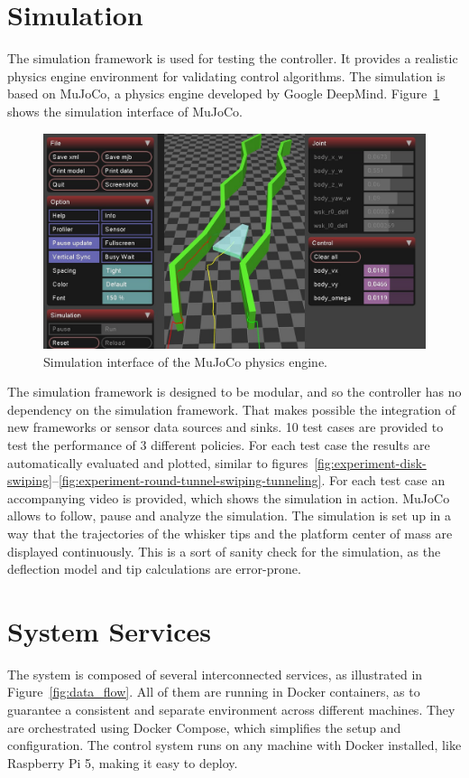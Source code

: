 \section{Simulation}
The simulation framework is used for testing the controller.
It provides a realistic physics engine environment for validating control algorithms.
The simulation is based on MuJoCo, a physics engine developed by Google DeepMind.
Figure~\ref{fig:mujoco} shows the simulation interface of MuJoCo.

\begin{figure}
    \centering
    \includegraphics[width=\textwidth]{figures/mujoco}
    \caption{Simulation interface of the MuJoCo physics engine.}
    \label{fig:mujoco}
\end{figure}

The simulation framework is designed to be modular, and so the controller has no dependency on the simulation framework.
That makes possible the integration of new frameworks or sensor data sources and sinks.
10 test cases are provided to test the performance of 3 different policies.
For each test case the results are automatically evaluated and plotted, similar to figures~\ref{fig:experiment-disk-swiping}--\ref{fig:experiment-round-tunnel-swiping-tunneling}.
For each test case an accompanying video is provided, which shows the simulation in action.
MuJoCo allows to follow, pause and analyze the simulation.
The simulation is set up in a way that the trajectories of the whisker tips and the platform center of mass are displayed continuously.
This is a sort of sanity check for the simulation, as the deflection model and tip calculations are error-prone.


\section{System Services}
The system is composed of several interconnected services, as illustrated in Figure~\ref{fig:data_flow}.
All of them are running in Docker containers, as to guarantee a consistent and separate environment across different machines.
They are orchestrated using Docker Compose, which simplifies the setup and configuration.
The control system runs on any machine with Docker installed, like Raspberry Pi 5, making it easy to deploy.

